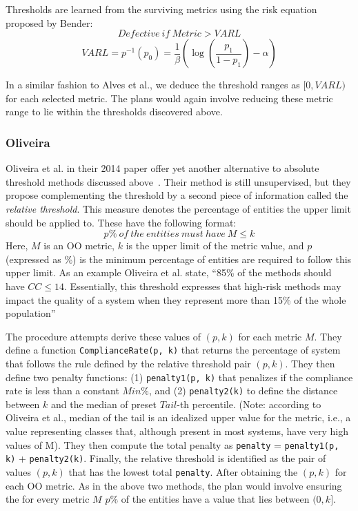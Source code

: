 \documentclass[10pt, journal, compsoc]{IEEEtran}
\begin{document}
Thresholds are learned from the surviving metrics using
the risk equation proposed by Bender:
$$ \mathit{Defective\ if}\ \mathit{Metric} > \mathit{VARL}$$
$$
	\mathit{VARL} = p^{-1}(p_0) = \frac{1}{\beta }\left( {\log \left( 
		{\frac{{{p_1}}}{{1 - {p_1}}}} \right) - \alpha } \right)
$$

In a similar fashion to Alves et al., we deduce the threshold ranges as $[0, VARL)$ for each selected metric. The plans would again involve reducing these metric range to lie within the thresholds discovered above.

\subsubsection{Oliveira}
Oliveira et al. in their 2014 paper offer yet another alternative to absolute threshold methods discussed above~\cite{oliveira}. Their method is still unsupervised, but they propose complementing the threshold by a second piece of information called the \textit{relative threshold}. This measure denotes the percentage of entities the upper limit should be applied to. These have the following format:
\[p\%\ of\ the\ entities\ must\ have\ M\leq k\]
Here, $M$ is an OO metric, $k$ is the upper limit of the metric value, and $p$ (expressed as \%) is the minimum percentage of entities are required to follow this upper limit. As an example Oliveira et al. state, ``85\% of the methods should have $CC \leq 14$. Essentially, this threshold expresses that high-risk methods may impact the quality of a system when they represent more than 15\% of the whole population''

The procedure attempts derive these values of $(p, k)$ for each metric $M$. They define a function \texttt{ComplianceRate(p, k)} that returns the percentage of system that follows the rule defined by the relative threshold pair $(p, k)$. They then define two penalty functions: (1) \texttt{penalty1(p, k)} that penalizes if the compliance rate is less than a constant $Min\%$, and (2) \texttt{penalty2(k)} to define the distance between $k$ and the median of preset $Tail$-th percentile. (Note: according to Oliveira et al., median of the tail is an idealized upper value for the metric, i.e., a value representing classes that, although present in most systems, have very high values of M). They then compute the total penalty as \texttt{penalty} = \texttt{penalty1(p, k)} + \texttt{penalty2(k)}. Finally, the relative threshold is identified as the pair of values $(p, k)$ that has the lowest total \texttt{penalty}. After obtaining the $(p, k)$ for each OO metric. As in the above two methods, the plan would involve ensuring the for every metric $M$ $p\%$ of the entities have a value that lies between $(0, k]$. 
\end{document}
